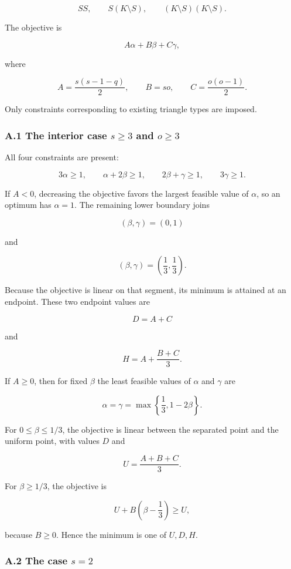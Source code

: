 \documentclass[
  american,
  11pt,
  a4paper,
]{article}
\begin{document}
\[
SS,\qquad S(K\setminus S),\qquad (K\setminus S)(K\setminus S).
\]

The objective is

\[
A\alpha+B\beta+C\gamma,
\]

where

\[
A=\frac{s(s-1-q)}2,
\qquad
B=so,
\qquad
C=\frac{o(o-1)}2.
\]

Only constraints corresponding to existing triangle types are imposed.

\subsubsection{\texorpdfstring{A.1 The interior case \(s\ge3\) and \(o\ge3\)}{A.1 The interior case s\textbackslash ge3 and o\textbackslash ge3}}\label{a.1-the-interior-case-sge3-and-oge3}

All four constraints are present:

\[
3\alpha\ge1,
\qquad
\alpha+2\beta\ge1,
\qquad
2\beta+\gamma\ge1,
\qquad
3\gamma\ge1.
\]

If \(A<0\), decreasing the objective favors the largest feasible value of \(\alpha\), so an optimum has \(\alpha=1\). The remaining lower boundary joins

\[
(\beta,\gamma)=(0,1)
\]

and

\[
(\beta,\gamma)=\left(\frac13,\frac13\right).
\]

Because the objective is linear on that segment, its minimum is attained at an endpoint. These two endpoint values are

\[
D=A+C
\]

and

\[
H=A+\frac{B+C}{3}.
\]

If \(A\ge0\), then for fixed \(\beta\) the least feasible values of \(\alpha\) and \(\gamma\) are

\[
\alpha=\gamma=\max\left\{\frac13,1-2\beta\right\}.
\]

For \(0\le\beta\le1/3\), the objective is linear between the separated point and the uniform point, with values \(D\) and

\[
U=\frac{A+B+C}{3}.
\]

For \(\beta\ge1/3\), the objective is

\[
U+B\left(\beta-\frac13\right)\ge U,
\]

because \(B\ge0\). Hence the minimum is one of \(U,D,H\).

\subsubsection{\texorpdfstring{A.2 The case \(s=2\)}{A.2 The case s=2}}\label{a.2-the-case-s2}
\end{document}
